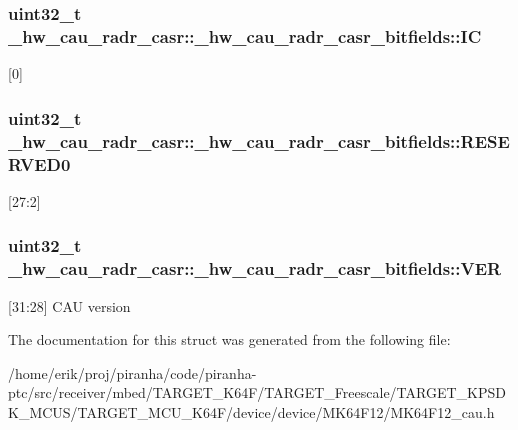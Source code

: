 \subsubsection[{\texorpdfstring{IC}{IC}}]{\setlength{\rightskip}{0pt plus 5cm}uint32\+\_\+t \+\_\+hw\+\_\+cau\+\_\+radr\+\_\+casr\+::\+\_\+hw\+\_\+cau\+\_\+radr\+\_\+casr\+\_\+bitfields\+::\+IC}\hypertarget{struct__hw__cau__radr__casr_1_1__hw__cau__radr__casr__bitfields_a7b2605beba44ccef1a82489877e1f898}{}\label{struct__hw__cau__radr__casr_1_1__hw__cau__radr__casr__bitfields_a7b2605beba44ccef1a82489877e1f898}
\mbox{[}0\mbox{]} 
\subsubsection[{\texorpdfstring{R\+E\+S\+E\+R\+V\+E\+D0}{RESERVED0}}]{\setlength{\rightskip}{0pt plus 5cm}uint32\+\_\+t \+\_\+hw\+\_\+cau\+\_\+radr\+\_\+casr\+::\+\_\+hw\+\_\+cau\+\_\+radr\+\_\+casr\+\_\+bitfields\+::\+R\+E\+S\+E\+R\+V\+E\+D0}\hypertarget{struct__hw__cau__radr__casr_1_1__hw__cau__radr__casr__bitfields_ab714032dc1a3428c549efe22c4b31f47}{}\label{struct__hw__cau__radr__casr_1_1__hw__cau__radr__casr__bitfields_ab714032dc1a3428c549efe22c4b31f47}
\mbox{[}27\+:2\mbox{]} 
\subsubsection[{\texorpdfstring{V\+ER}{VER}}]{\setlength{\rightskip}{0pt plus 5cm}uint32\+\_\+t \+\_\+hw\+\_\+cau\+\_\+radr\+\_\+casr\+::\+\_\+hw\+\_\+cau\+\_\+radr\+\_\+casr\+\_\+bitfields\+::\+V\+ER}\hypertarget{struct__hw__cau__radr__casr_1_1__hw__cau__radr__casr__bitfields_aafbc75da23703c234a0c45e45f389de9}{}\label{struct__hw__cau__radr__casr_1_1__hw__cau__radr__casr__bitfields_aafbc75da23703c234a0c45e45f389de9}
\mbox{[}31\+:28\mbox{]} C\+AU version 

The documentation for this struct was generated from the following file\+:\begin{DoxyCompactItemize}
\item 
/home/erik/proj/piranha/code/piranha-\/ptc/src/receiver/mbed/\+T\+A\+R\+G\+E\+T\+\_\+\+K64\+F/\+T\+A\+R\+G\+E\+T\+\_\+\+Freescale/\+T\+A\+R\+G\+E\+T\+\_\+\+K\+P\+S\+D\+K\+\_\+\+M\+C\+U\+S/\+T\+A\+R\+G\+E\+T\+\_\+\+M\+C\+U\+\_\+\+K64\+F/device/device/\+M\+K64\+F12/M\+K64\+F12\+\_\+cau.\+h\end{DoxyCompactItemize}
